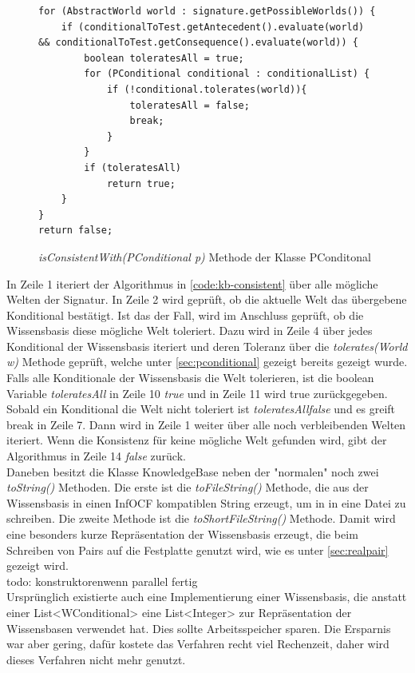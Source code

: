 \documentclass[12pt,a4paper]{article}
\begin{document}
\begin{figure}
\begin{lstlisting}
for (AbstractWorld world : signature.getPossibleWorlds()) {
    if (conditionalToTest.getAntecedent().evaluate(world) && conditionalToTest.getConsequence().evaluate(world)) {
        boolean toleratesAll = true;
        for (PConditional conditional : conditionalList) {
            if (!conditional.tolerates(world)){
                toleratesAll = false;
                break;
            }              
        }
        if (toleratesAll)
            return true;
    }
}
return false;
\end{lstlisting}
\caption{\textit{isConsistentWith(PConditional p)} Methode der Klasse PConditonal}
\label{code:kb-consistent}
\end{figure} 

In Zeile 1 iteriert der Algorithmus in \autoref{code:kb-consistent} über alle mögliche Welten der Signatur. In Zeile 2 wird geprüft, ob die aktuelle Welt das übergebene Konditional bestätigt. Ist das der Fall, wird im Anschluss geprüft, ob die Wissensbasis diese mögliche Welt toleriert. Dazu wird in Zeile 4 über jedes Konditional der Wissensbasis iteriert und deren Toleranz über die \textit{tolerates(World w)} Methode geprüft, welche unter \autoref{sec:pconditional} gezeigt bereits gezeigt wurde. \\
Falls alle Konditionale der Wissensbasis die Welt tolerieren, ist die boolean Variable \textit{toleratesAll} in Zeile 10 \textit{true} und in Zeile 11 wird true zurückgegeben. Sobald ein Konditional die Welt nicht toleriert ist \textit{toleratesAll}\textit{false} und es greift break in Zeile 7. Dann wird in Zeile 1 weiter über alle noch verbleibenden Welten iteriert. Wenn die Konsistenz für keine mögliche Welt gefunden wird, gibt der Algorithmus in Zeile 14 \textit {false} zurück. \\
Daneben besitzt die Klasse KnowledgeBase neben der "normalen" noch zwei \textit{toString()} Methoden. Die erste ist die \textit{toFileString()} Methode, die aus der Wissensbasis in einen InfOCF kompatiblen String erzeugt, um in in eine Datei zu schreiben. Die zweite Methode ist die \textit{toShortFileString()} Methode. Damit wird eine besonders kurze Repräsentation der Wissensbasis erzeugt, die beim Schreiben von Pairs auf die Festplatte genutzt wird, wie es unter \autoref{sec:realpair} gezeigt wird. \\
todo: konstruktorenwenn parallel fertig \\
Ursprünglich existierte auch eine Implementierung einer Wissensbasis, die anstatt einer List<WConditional> eine List<Integer> zur Repräsentation der Wissensbasen verwendet hat. Dies sollte Arbeitsspeicher sparen. Die Ersparnis war aber gering, dafür kostete das Verfahren recht viel Rechenzeit, daher wird dieses Verfahren nicht mehr genutzt.
\end{document}
